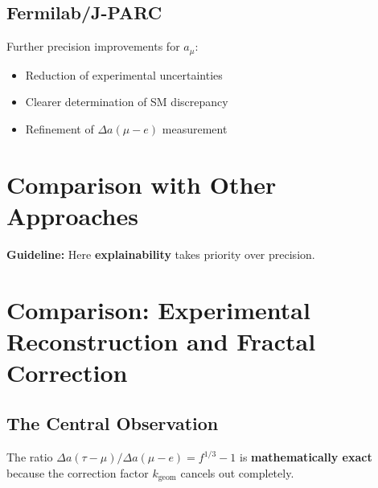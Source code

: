 	\subsection{Fermilab/J-PARC}
	
	Further precision improvements for $a_\mu$:
	\begin{itemize}
		\item Reduction of experimental uncertainties
		\item Clearer determination of SM discrepancy
		\item Refinement of $\Delta a(\mu - e)$ measurement
	\end{itemize}
	
	\section{Comparison with Other Approaches}
	
	\begin{table}[h]
		\centering
		\caption{Comparison of different approaches}
	\end{table}
	
	\textbf{Guideline:} Here \textbf{explainability} takes priority over precision.
	
	\section{Comparison: Experimental Reconstruction and Fractal Correction}
	
	\subsection{The Central Observation}
	
	The ratio $\Delta a(\tau-\mu) / \Delta a(\mu-e) = f^{1/3} - 1$ is \textbf{mathematically exact} because the correction factor $k_{\text{geom}}$ cancels out completely.
	
